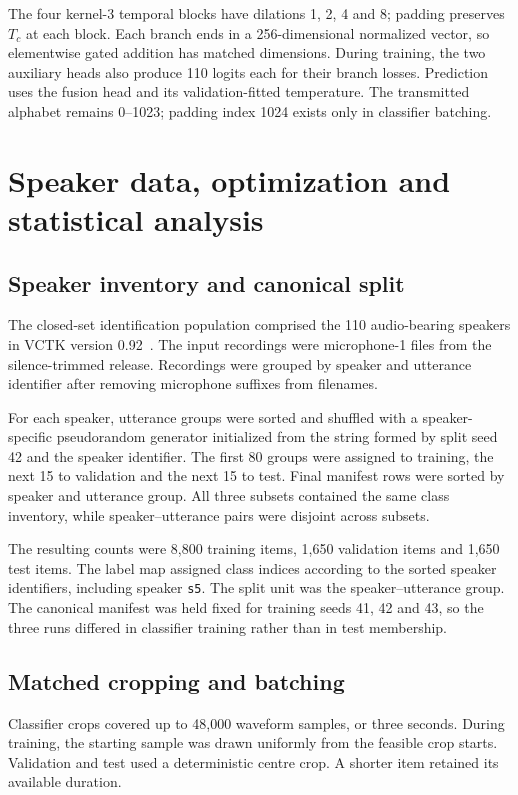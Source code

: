 The four kernel-3 temporal blocks have dilations 1, 2, 4 and 8; padding preserves $T_c$ at each block. Each branch ends in a 256-dimensional normalized vector, so elementwise gated addition has matched dimensions. During training, the two auxiliary heads also produce 110 logits each for their branch losses. Prediction uses the fusion head and its validation-fitted temperature. The transmitted alphabet remains 0--1023; padding index 1024 exists only in classifier batching.

\flushbottom
\section{Speaker data, optimization and statistical analysis}
\label{sec:sv2-speaker-protocol}

\subsection{Speaker inventory and canonical split}
The closed-set identification population comprised the 110 audio-bearing speakers in VCTK version 0.92~\cite{vctk}. The input recordings were microphone-1 files from the silence-trimmed release. Recordings were grouped by speaker and utterance identifier after removing microphone suffixes from filenames.

For each speaker, utterance groups were sorted and shuffled with a speaker-specific pseudorandom generator initialized from the string formed by split seed 42 and the speaker identifier. The first 80 groups were assigned to training, the next 15 to validation and the next 15 to test. Final manifest rows were sorted by speaker and utterance group. All three subsets contained the same class inventory, while speaker--utterance pairs were disjoint across subsets.

The resulting counts were 8,800 training items, 1,650 validation items and 1,650 test items. The label map assigned class indices according to the sorted speaker identifiers, including speaker \texttt{s5}. The split unit was the speaker--utterance group. The canonical manifest was held fixed for training seeds 41, 42 and 43, so the three runs differed in classifier training rather than in test membership.

\subsection{Matched cropping and batching}
Classifier crops covered up to 48,000 waveform samples, or three seconds. During training, the starting sample was drawn uniformly from the feasible crop starts. Validation and test used a deterministic centre crop. A shorter item retained its available duration.

